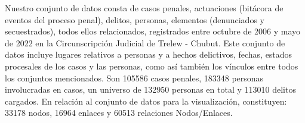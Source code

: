 Nuestro conjunto de datos consta de casos penales, actuaciones (bitácora de eventos del proceso penal), delitos, personas, elementos (denunciados y secuestrados), todos ellos relacionados, registrados entre octubre de 2006 y mayo de 2022 en la Circunscripción Judicial de Trelew - Chubut. 
Este conjunto de datos incluye lugares relativos a personas y a hechos delictivos, fechas, estados procesales de los casos y las personas, como así también los vínculos entre todos los conjuntos mencionados. 
Son 105586 casos penales, 183348 personas involucradas en casos, un universo de 132950 personas en total y 113010 delitos cargados. En relación al conjunto de datos para la visualización, constituyen: 33178 nodos, 16964 enlaces y 60513 relaciones Nodos/Enlaces.